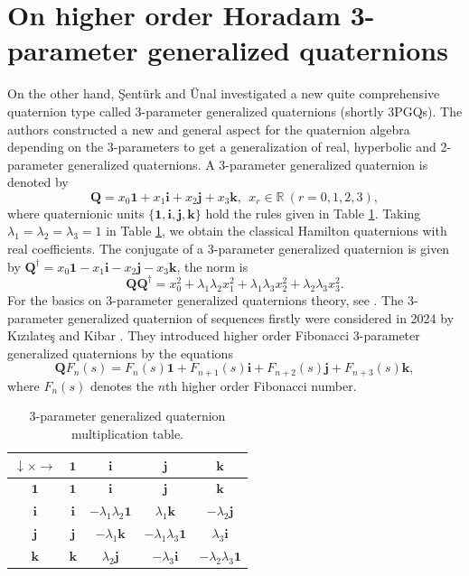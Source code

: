 \documentclass{kms-c}
\theoremstyle{plain}
\theoremstyle{definition}
\theoremstyle{remark}
\begin{document}
\section{On higher order Horadam 3-parameter generalized quaternions}
On the other hand, \c{S}ent\"urk and \"Unal \cite{Se} investigated a new quite comprehensive quaternion type called 3-parameter generalized quaternions (shortly 3PGQs). The authors constructed a new and general aspect for the quaternion algebra depending on the 3-parameters to get a generalization of real, hyperbolic and 2-parameter generalized quaternions. A 3-parameter generalized quaternion is denoted by
\[
\textbf{Q}=x_{0}\textbf{1}+x_{1}\textbf{i}+x_{2}\textbf{j}+x_{3}\textbf{k},\ \ x_{r}\in \mathbb{R}\ (r=0,1,2,3),
\]
where quaternionic units $\{\textbf{1}, \textbf{i}, \textbf{j}, \textbf{k}\}$ hold the rules given in Table \ref{t1}. Taking $\lambda_{1}=\lambda_{2}=\lambda_{3}=1$ in Table \ref{t1}, we obtain the classical Hamilton quaternions with real coefficients. The conjugate of a 3-parameter generalized quaternion is given by $\textbf{Q}^{\dagger}=x_{0}\textbf{1}-x_{1}\textbf{i}-x_{2}\textbf{j}-x_{3}\textbf{k}$, the norm is 
\[
\textbf{Q}\textbf{Q}^{\dagger}=x_{0}^{2}+\lambda_{1}\lambda_{2}x_{1}^{2}+\lambda_{1}\lambda_{3}x_{2}^{2}+\lambda_{2}\lambda_{3}x_{3}^{2}.
\]
For the basics on 3-parameter generalized quaternions theory, see \cite{Se}. The 3-parameter generalized quaternion of sequences firstly were considered in 2024 by K\i z\i late\c{s} and Kibar \cite{Ki3}. They introduced higher order Fibonacci 3-parameter generalized quaternions by the equations
\[
\textbf{Q}F_{n}(s)=F_{n}(s)\textbf{1}+F_{n+1}(s)\textbf{i}+F_{n+2}(s)\textbf{j}+F_{n+3}(s)\textbf{k},
\]
where $F_{n}(s)$ denotes the $n$th higher order Fibonacci number.
\begin{table}
		\centering
\begin{tabular}{|c|c|c|c|c|}
\hline
$\downarrow \times \rightarrow$ & $\textbf{1}$ & $\textbf{i}$ & $\textbf{j}$ & $\textbf{k}$ \\
\hline
$\textbf{1}$ & $\textbf{1}$ & $\textbf{i}$ & $\textbf{j}$ & $\textbf{k}$ \\
\hline
$\textbf{i}$ & $\textbf{i}$ & $-\lambda_{1}\lambda_{2}\textbf{1}$ & $\lambda_{1}\textbf{k}$ & $-\lambda_{2}\textbf{j}$ \\
\hline
$\textbf{j}$ & $\textbf{j}$ & $-\lambda_{1}\textbf{k}$ & $-\lambda_{1}\lambda_{3}\textbf{1}$ & $\lambda_{3}\textbf{i}$ \\
\hline
$\textbf{k}$ & $\textbf{k}$ & $\lambda_{2}\textbf{j}$ & $-\lambda_{3}\textbf{i}$ & $-\lambda_{2}\lambda_{3}\textbf{1}$ \\
\hline
\end{tabular}
			\caption{3-parameter generalized quaternion multiplication table.}
			\label{t1} 
\end{table} 
\end{document}
